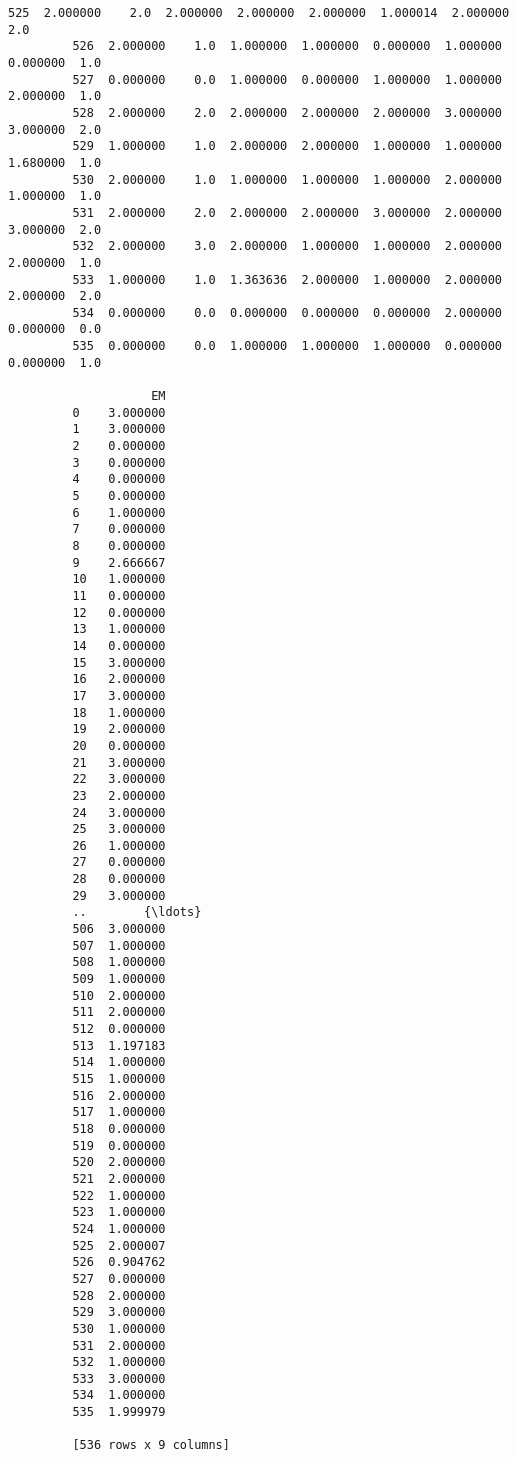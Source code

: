 \documentclass[11pt]{article}
\begin{document}
\begin{Verbatim}[commandchars=\\\{\}]
         525  2.000000    2.0  2.000000  2.000000  2.000000  1.000014  2.000000  2.0   
         526  2.000000    1.0  1.000000  1.000000  0.000000  1.000000  0.000000  1.0   
         527  0.000000    0.0  1.000000  0.000000  1.000000  1.000000  2.000000  1.0   
         528  2.000000    2.0  2.000000  2.000000  2.000000  3.000000  3.000000  2.0   
         529  1.000000    1.0  2.000000  2.000000  1.000000  1.000000  1.680000  1.0   
         530  2.000000    1.0  1.000000  1.000000  1.000000  2.000000  1.000000  1.0   
         531  2.000000    2.0  2.000000  2.000000  3.000000  2.000000  3.000000  2.0   
         532  2.000000    3.0  2.000000  1.000000  1.000000  2.000000  2.000000  1.0   
         533  1.000000    1.0  1.363636  2.000000  1.000000  2.000000  2.000000  2.0   
         534  0.000000    0.0  0.000000  0.000000  0.000000  2.000000  0.000000  0.0   
         535  0.000000    0.0  1.000000  1.000000  1.000000  0.000000  0.000000  1.0   
         
                    EM  
         0    3.000000  
         1    3.000000  
         2    0.000000  
         3    0.000000  
         4    0.000000  
         5    0.000000  
         6    1.000000  
         7    0.000000  
         8    0.000000  
         9    2.666667  
         10   1.000000  
         11   0.000000  
         12   0.000000  
         13   1.000000  
         14   0.000000  
         15   3.000000  
         16   2.000000  
         17   3.000000  
         18   1.000000  
         19   2.000000  
         20   0.000000  
         21   3.000000  
         22   3.000000  
         23   2.000000  
         24   3.000000  
         25   3.000000  
         26   1.000000  
         27   0.000000  
         28   0.000000  
         29   3.000000  
         ..        {\ldots}  
         506  3.000000  
         507  1.000000  
         508  1.000000  
         509  1.000000  
         510  2.000000  
         511  2.000000  
         512  0.000000  
         513  1.197183  
         514  1.000000  
         515  1.000000  
         516  2.000000  
         517  1.000000  
         518  0.000000  
         519  0.000000  
         520  2.000000  
         521  2.000000  
         522  1.000000  
         523  1.000000  
         524  1.000000  
         525  2.000007  
         526  0.904762  
         527  0.000000  
         528  2.000000  
         529  3.000000  
         530  1.000000  
         531  2.000000  
         532  1.000000  
         533  3.000000  
         534  1.000000  
         535  1.999979  
         
         [536 rows x 9 columns]
\end{Verbatim}
            
\end{document}
